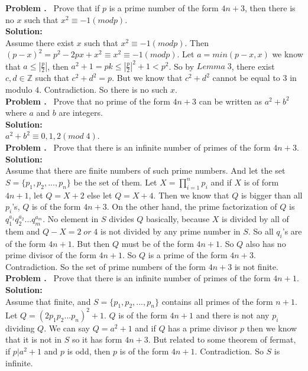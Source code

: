 \documentclass{article}
\newcounter{problem}
\newcounter{solution}
\newcommand\Problem{%
  \stepcounter{problem}%
  \textbf{Problem \theproblem.}~%
  \setcounter{solution}{0}%
}
\newcommand\TheSolution{%
  \textbf{\\Solution:}\\%
}
\begin{document}
\Problem{}
Prove that if $p$ is a prime number of the form $4n + 3$, then there is no $x$ such that $x^2 \equiv -1 (mod p)$.
\TheSolution{}
Assume there exist $x$ such that $x^2 \equiv -1 (mod p)$. Then $(p-x)^2=p^2-2px+x^2 \equiv x^2 \equiv -1 (mod p)$. Let $a=min(p-x,x)$ we know that $a\leq |\frac{p}{2}|$, then $a^2+1=pk\leq |\frac{p}{2}|^2+1<p^2$. So by $Lemma\;3$, there exist $c,d\in \mathbb{Z}$ such that $c^2+d^2=p$. But we know that $c^2+d^2$ cannot be equal to $3$ in modulo $4$. Contradiction. So there is no such $x$.\\


\Problem{}
Prove that no prime of the form $4n + 3$ can be written as $a^2+b^2$ where $a$ and $b$ are integers.
\TheSolution{}
$a^2+b^2\equiv0,1,2(mod\;4)$.\\


\Problem{}
Prove that there is an infinite number of primes of the form $4n+3$.
\TheSolution{}
Assume that there are finite numbers of such prime numbers. And let the set $S=\{p_1,p_2,...,p_n\}$ be the set of them. Let $X=\prod_{i=1}^{n}p_i$ and if $X$ is of form $4n+1$, let $Q=X+2$ else let $Q=X+4$. Then we know that $Q$ is bigger than all $p_i$'s, $Q$ is of the form $4n+3$. On the other hand, the prime factorization of $Q$ is $q_1^{a_1}q_2^{a_2}...q_m^{a_m}$. No element in $S$ divides $Q$ basically, because $X$ is divided by all of them and $Q-X=2\;or\;4$ is not divided by any prime number in $S$. So all $q_i$'s are of the form $4n+1$. But then $Q$ must be of the form $4n+1$. So $Q$ also has no prime divisor of the form $4n+1$. So $Q$ is a prime of the form $4n+3$. Contradiction. So the set of prime numbers of the form $4n+3$ is not finite.\\

\Problem{}
Prove that there is an infinite number of primes of the form $4n+1$.
\TheSolution{}
Assume that finite, and $S=\{p_1,p_2,...,p_n\}$ contains all primes of the form $n+1$. Let $Q=(2p_1p_2...p_n)^2+1$. $Q$ is of the form $4n+1$ and there is not any $p_i$ dividing $Q$. We can say $Q=a^2+1$ and if $Q$ has a prime divisor $p$ then we know that it is not in $S$ so it has form $4n+3$. But related to some theorem of fermat, if $p|a^2+1$ and $p$ is odd, then $p$ is of the form $4n+1$. Contradiction. So $S$ is infinite.\\
\end{document}
